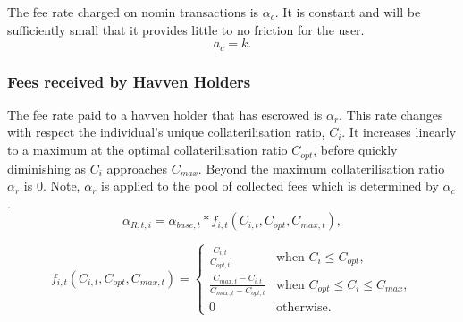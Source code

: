 \noindent The fee rate charged on nomin transactions is $\alpha_c$. It is constant and will be sufficiently small that it provides little to no friction for the user.\\

$$ a_c = k.$$ 

\begin{center}
\end{center}

\newpage
\subsubsection{Fees received by Havven Holders}

\noindent The fee rate paid to a havven holder that has escrowed is $\alpha_r$. This rate changes with respect the individual's unique collaterilisation ratio, $C_i$. It increases linearly to a maximum at the optimal collaterilisation ratio $C_{opt}$, before quickly diminishing as $C_i$ approaches $C_{max}$. Beyond the maximum collaterilisation ratio $\alpha_r$ is 0. Note, $\alpha_r$ is applied to the pool of collected fees which is determined by $\alpha_c$. \\

$$ \alpha_{R,t,i} = \alpha_{base,t} * f_{i,t}(C_{i,t}, C_{opt}, C_{max,t}), $$

\[
f_{i,t}(C_{i,t}, C_{opt}, C_{max,t}) = 
\begin{cases}
 \frac{C_{i,t}}{C_{opt,t}} &\mbox{when } C_i \leq C_{opt}, \\[1em]
 \frac{C_{max,t} - C_{i,t}}{C_{max,t} - C_{opt,t}} &\mbox{when } C_{opt} \leq C_i \leq C_{max}, \\[1em]
 0 &\mbox{otherwise}.
 \end{cases}
\]

\begin{center}
\end{center}

